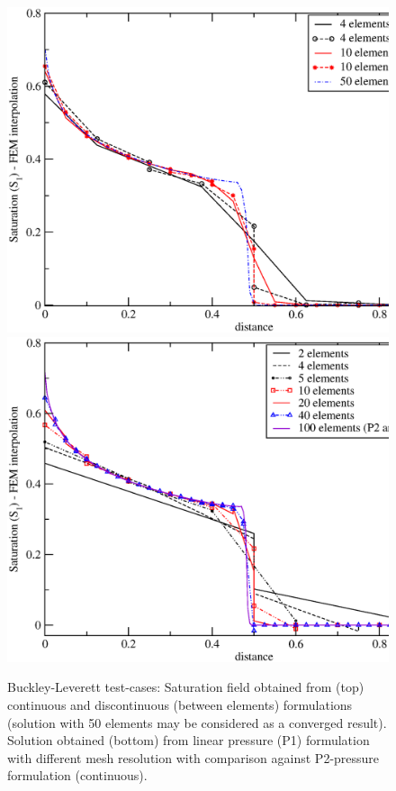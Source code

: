 \begin{figure}[h]
\vbox{
\hbox{\hspace{.3cm}\includegraphics[width=.9\textwidth]{./diagrams/bl-dg-4-10-vers-cty}}
\vspace{-0.cm}
\hbox{\hspace{.3cm}\includegraphics[width=.9\textwidth]{./diagrams/bl-dg-p1-2-4-5-10-20-40}}}
\caption{Buckley-Leverett test-cases: Saturation field obtained from (top) continuous and discontinuous (between elements) formulations (solution with 50 elements may be considered as a converged result). Solution obtained (bottom) from linear pressure (P1) formulation with different mesh resolution with comparison against P2-pressure formulation (continuous). \label{bl-dg-4-10-vers-cty}}
\end{figure}


